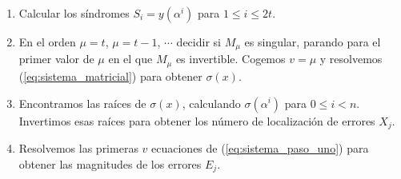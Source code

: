 \begin{enumerate}
	\item Calcular los síndromes $S_i = y(\alpha^i)$ para $ 1 \leq i \leq 2t$.
	\item En el orden $\mu = t$, $\mu = t-1$, $\cdots$ decidir si $M_\mu$ es singular, parando para el primer valor de $\mu$ en el que $M_\mu$ es invertible. Cogemos $v = \mu$ y resolvemos (\ref{eq:sistema_matricial}) para obtener $\sigma(x)$.
	\item Encontramos las raíces de $\sigma(x)$, calculando $\sigma(\alpha^i)$ para $ 0 \leq i < n$. Invertimos esas raíces para obtener los número de localización de errores $X_j$.
	\item Resolvemos las primeras $v$ ecuaciones de (\ref{eq:sistema_paso_uno}) para obtener las magnitudes de los errores $E_j$. 
\end{enumerate}

